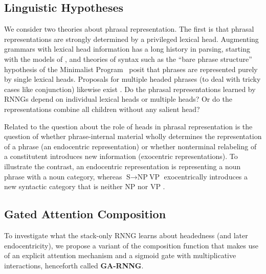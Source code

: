 \documentclass[11pt]{article}
\newcommand{\ask}[1]{\textcolor{orange}{{\textbf{[#1 --\textsc{ask}]}}}}
\newcommand{\cjd}[1]{\textcolor{cyan}{{\textbf{[#1 --\textsc{cjd}]}}}}
\renewcommand{\ask}[1]{}
\renewcommand{\cjd}[1]{}
\begin{document}
\subsection{Linguistic Hypotheses}
We consider two theories about phrasal representation. The first is that phrasal representations are strongly determined by a privileged lexical head. Augmenting grammars with lexical head information has a long history in parsing, starting with the models of , and theories of syntax such as the ``bare phrase structure'' hypothesis of the Minimalist Program~\cite{chomsky:1993} posit that phrases are represented purely by single lexical heads. Proposals for multiple headed phrases (to deal with tricky cases like conjunction) likewise exist \cite{jackendoff:1977,keenan:1987}. Do the phrasal representations learned by RNNGs depend on individual lexical heads or multiple heads? Or do the representations combine all children without any salient head?
 
Related to the question about the role of heads in phrasal representation is the question of whether phrase-internal material wholly determines the representation of a phrase (an endocentric representation) or whether nonterminal relabeling of a constitutent introduces new information (exocentric representations). To illustrate the contrast, an endocentric representation is representing a noun phrase with a noun category, whereas $\text{S} \rightarrow \text{NP}\ \text{VP}$ exocentrically introduces a new syntactic category that is neither NP nor VP \cite{chomsky:1970}.

\subsection{Gated Attention Composition}
To investigate what the stack-only RNNG learns about headedness (and later endocentricity), we propose a variant of the composition function that makes use of an explicit attention mechanism \cite{bahdanau_15} and a sigmoid gate with multiplicative interactions, henceforth called \textbf{GA-RNNG}. %
\end{document}
